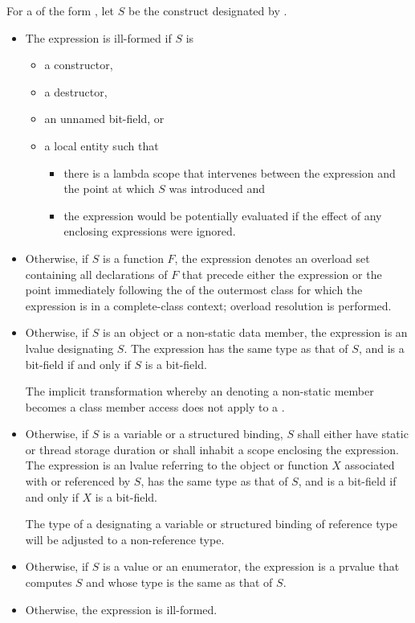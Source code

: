 \pnum
For a  of the form ,
let $S$ be the construct designated by .
\begin{itemize}
\item
The expression is ill-formed if $S$ is
\begin{itemize}
\item
a constructor,
\item
a destructor,
\item
an unnamed bit-field, or
\item
a local entity such that
\begin{itemize}
\item
there is a lambda scope that intervenes
between the expression and the point at which $S$ was introduced and
\item
the expression would be potentially evaluated
if the effect of any enclosing  expressions
were ignored.
\end{itemize}
\end{itemize}
\item
Otherwise, if $S$ is a function $F$,
the expression denotes an overload set containing all declarations of $F$
that precede either the expression or
the point immediately following the  of
the outermost class for which the expression is in a complete-class context;
overload resolution is performed.
\item
Otherwise, if $S$ is an object or a non-static data member,
the expression is an lvalue designating $S$.
The expression has the same type as that of $S$, and
is a bit-field if and only if $S$ is a bit-field.
\begin{note}
The implicit transformation
whereby an  denoting a non-static member
becomes a class member access
does not apply to a .
\end{note}
\item
Otherwise, if $S$ is a variable or a structured binding,
$S$ shall either have static or thread storage duration or
shall inhabit a scope enclosing the expression.
The expression is an lvalue referring to the object or function $X$
associated with or referenced by $S$,
has the same type as that of $S$, and
is a bit-field if and only if $X$ is a bit-field.
\begin{note}
The type of a 
designating a variable or structured binding of reference type
will be adjusted to a non-reference type.
\end{note}
\item
Otherwise, if $S$ is a value or an enumerator,
the expression is a prvalue that computes $S$ and
whose type is the same as that of $S$.
\item
Otherwise, the expression is ill-formed.
\end{itemize}

